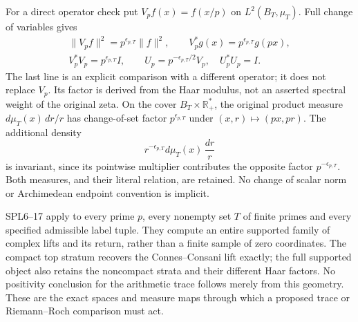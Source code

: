 For a direct operator check put $V_p f(x)=f(x/p)$ on
$L^2(B_T,\mu_T)$. Full change of variables gives
\begin{equation}\tag{SPL16}
\begin{gathered}
\|V_p f\|^2=p^{\epsilon_{p,T}}\|f\|^2,\qquad
V_p^*g(x)=p^{\epsilon_{p,T}}g(px),\\
V_p^*V_p=p^{\epsilon_{p,T}}I,\qquad
U_p=p^{-\epsilon_{p,T}/2}V_p,\quad U_p^*U_p=I.
\end{gathered}
\end{equation}
The last line is an explicit comparison with a different operator;
it does not replace $V_p$. Its factor is derived from the Haar
modulus, not an asserted spectral weight of the original zeta.
On the cover $B_T\times\mathbb R_+^*$, the original product measure
$d\mu_T(x)\,dr/r$ has change-of-set factor $p^{\epsilon_{p,T}}$
under $(x,r)\mapsto(px,pr)$. The additional density
\begin{equation}\tag{SPL17}
r^{-\epsilon_{p,T}}d\mu_T(x)\,\frac{dr}{r}
\end{equation}
is invariant, since its pointwise multiplier contributes the
opposite factor $p^{-\epsilon_{p,T}}$. Both measures, and their
literal relation, are retained. No change of scalar norm or
Archimedean endpoint convention is implicit.

SPL6--17 apply to every prime $p$, every nonempty set $T$ of finite
primes and every specified admissible label tuple. They compute an
entire supported family of complex lifts and its return, rather
than a finite sample of zero coordinates. The compact top stratum
recovers the Connes--Consani lift exactly; the full supported object
also retains the noncompact strata and their different Haar factors.
No positivity conclusion for the arithmetic trace follows merely
from this geometry. These are the exact spaces and measure maps
through which a proposed trace or Riemann--Roch comparison must act.
